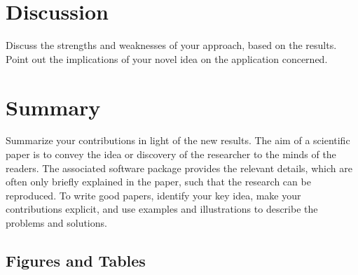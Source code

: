 \documentclass[10pt,conference,compsocconf]{IEEEtran}
\begin{document}
\section{Discussion}\label{sec: discussion}
    Discuss the strengths and weaknesses of your
    approach, based on the results. Point out the implications of your
    novel idea on the application concerned.
\section{Summary}\label{sec: summary}
    Summarize your contributions in light of the new
    results.
    The aim of a scientific paper is to convey the idea or discovery of
    the researcher to the minds of the readers. The associated software
    package provides the relevant details, which are often only briefly
    explained in the paper, such that the research can be reproduced.
    To write good papers, identify your key idea, make your contributions
    explicit, and use examples and illustrations to describe the problems
    and solutions.
\subsection{Figures and Tables}
\end{document}
